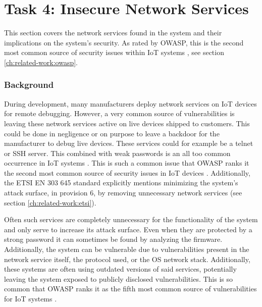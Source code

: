 \section{Task 4: Insecure Network Services} \label{ch:pentesting:network-services}
This section covers the network services found in the system and their implications on the system's security. As rated by OWASP, this is the second most common source of security issues within IoT systems \cite{owasp-iot-top10}, see section \ref{ch:related-work:owasp}.

\subsubsection{Background}
During development, many manufacturers deploy network services on IoT devices for remote debugging. However, a very common source of vulnerabilities is leaving these network services active on live devices shipped to customers. This could be done in negligence or on purpose to leave a backdoor for the manufacturer to debug live devices. These services could for example be a telnet or SSH server. This combined with weak passwords is an all too common occurrence in IoT systems \cite{understanding-mirai}. This is such a common issue that OWASP ranks it the second most common source of security issues in IoT devices \cite{owasp-iot-top10}. Additionally, the ETSI EN 303 645 standard explicitly mentions minimizing the system's attack surface, in provision 6, by removing unnecessary network services \cite{etsi-iot-standard} (see section \ref{ch:related-work:etsi}).

Often such services are completely unnecessary for the functionality of the system and only serve to increase its attack surface. Even when they are protected by a strong password it can sometimes be found by analyzing the firmware. Additionally, the system can be vulnerable due to vulnerabilities present in the network service itself, the protocol used, or the OS network stack. Additionally, these systems are often using outdated versions of said services, potentially leaving the system exposed to publicly disclosed vulnerabilities. This is so common that OWASP ranks it as the fifth most common source of vulnerabilities for IoT systems \cite{owasp-iot-top10}.

